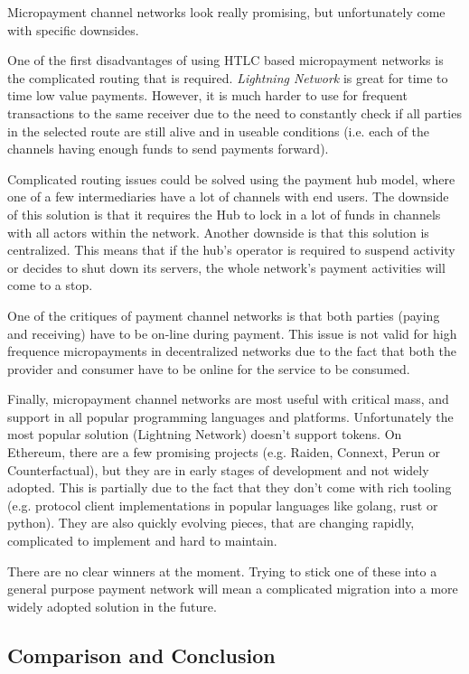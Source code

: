 \documentclass[a4paper,12pt]{article}
\begin{document}
Micropayment channel networks look really promising, but unfortunately come with 
specific downsides. 

One of the first disadvantages of using HTLC based micropayment networks is the 
complicated routing that is required. \textit{Lightning Network} is great for time 
to time low value payments. However, it is much harder to use for frequent 
transactions to the same receiver due to the need to constantly check if all 
parties in the selected route are still alive and in useable conditions (i.e. each 
of the channels having enough funds to send payments forward). 

Complicated routing issues could be solved using the payment hub model, where one 
of a few intermediaries have a lot of channels with end users. The downside of this 
solution is that it requires the Hub to lock in a lot of funds in channels with all 
actors within the network. Another downside is that this solution is centralized. 
This means that if the hub’s operator is required to suspend activity or decides 
to shut down its servers, the whole network’s payment activities will come to a 
stop.

One of the critiques of payment channel networks is that both parties (paying and 
receiving) have to be on-line during payment. This issue is not valid for high 
frequence micropayments in decentralized networks due to the fact that both the 
provider and consumer have to be online for the service to be consumed.

Finally, micropayment channel networks are most useful with critical mass, and 
support in all popular programming languages and platforms. Unfortunately the most 
popular solution (Lightning Network) doesn’t support tokens. On Ethereum, there are 
a few promising projects (e.g. Raiden, Connext, Perun or Counterfactual), but they 
are in early stages of development and not widely adopted. This is partially due to 
the fact that they don’t come with rich tooling (e.g. protocol client 
implementations in popular languages like golang, rust or python). They are also 
quickly evolving pieces, that are changing rapidly, complicated to implement and 
hard to maintain. 

There are no clear winners at the moment. Trying to stick one of these into a 
general purpose payment network will mean a complicated migration into a more 
widely adopted solution in the future.

\subsection{Comparison and Conclusion}
\end{document}

